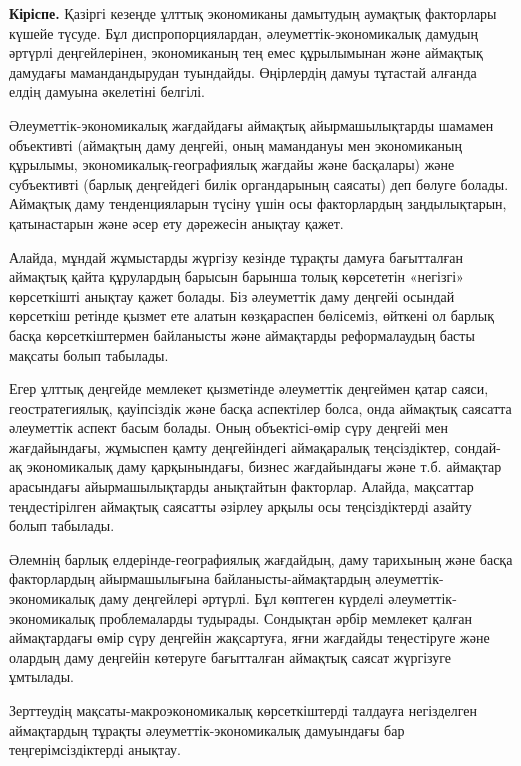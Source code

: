 \begin{multicols}{2}
{\bfseries Кіріспе.} Қазіргі кезеңде ұлттық экономиканы дамытудың аумақтық
факторлары күшейе түсуде. Бұл диспропорциялардан,
әлеуметтік-экономикалық дамудың әртүрлі деңгейлерінен, экономиканың тең
емес құрылымынан және аймақтық дамудағы мамандандырудан туындайды.
Өңірлердің дамуы тұтастай алғанда елдің дамуына әкелетіні белгілі.

Әлеуметтік-экономикалық жағдайдағы аймақтық айырмашылықтарды шамамен
объективті (аймақтың даму деңгейі, оның мамандануы мен экономиканың
құрылымы, экономикалық-географиялық жағдайы және басқалары) және
субъективті (барлық деңгейдегі билік органдарының саясаты) деп бөлуге
болады. Аймақтық даму тенденцияларын түсіну үшін осы факторлардың
заңдылықтарын, қатынастарын және әсер ету дәрежесін анықтау қажет.

Алайда, мұндай жұмыстарды жүргізу кезінде тұрақты дамуға бағытталған
аймақтық қайта құрулардың барысын барынша толық көрсететін «негізгі»
көрсеткішті анықтау қажет болады. Біз әлеуметтік даму деңгейі осындай
көрсеткіш ретінде қызмет ете алатын көзқараспен бөлісеміз, өйткені ол
барлық басқа көрсеткіштермен байланысты және аймақтарды реформалаудың
басты мақсаты болып табылады.

Егер ұлттық деңгейде мемлекет қызметінде әлеуметтік деңгеймен қатар
саяси, геостратегиялық, қауіпсіздік және басқа аспектілер болса, онда
аймақтық саясатта әлеуметтік аспект басым болады. Оның объектісі-өмір
сүру деңгейі мен жағдайындағы, жұмыспен қамту деңгейіндегі аймақаралық
теңсіздіктер, сондай-ақ экономикалық даму қарқынындағы, бизнес
жағдайындағы және т.б. аймақтар арасындағы айырмашылықтарды анықтайтын
факторлар. Алайда, мақсаттар теңдестірілген аймақтық саясатты әзірлеу
арқылы осы теңсіздіктерді азайту болып табылады.

Әлемнің барлық елдерінде-географиялық жағдайдың, даму тарихының және
басқа факторлардың айырмашылығына байланысты-аймақтардың
әлеуметтік-экономикалық даму деңгейлері әртүрлі. Бұл көптеген күрделі
әлеуметтік-экономикалық проблемаларды тудырады. Сондықтан әрбір мемлекет
қалған аймақтардағы өмір сүру деңгейін жақсартуға, яғни жағдайды
теңестіруге және олардың даму деңгейін көтеруге бағытталған аймақтық
саясат жүргізуге ұмтылады.

Зерттеудің мақсаты-макроэкономикалық көрсеткіштерді талдауға негізделген
аймақтардың тұрақты әлеуметтік-экономикалық дамуындағы бар
теңгерімсіздіктерді анықтау.


\end{multicols}
